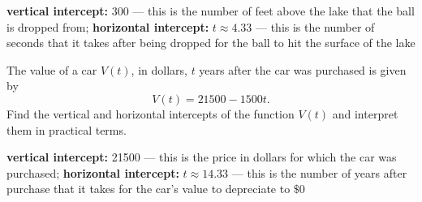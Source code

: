 \begin{solution}
    {\bf vertical intercept:} 300 --- this is the number of feet above the lake that the ball is dropped from; {\bf horizontal intercept:} $t \approx 4.33$ --- this is the number of seconds that it takes after being dropped for the ball to hit the surface of the lake
\end{solution}







\begin{exercise}
The value of a car $V(t)$, in dollars, $t$ years after the car was purchased is given by
\[V(t)=21500-1500t.\]
Find the vertical and horizontal intercepts of the function $V(t)$ and interpret them in practical terms.

\end{exercise}


\begin{solution}
    {\bf vertical intercept:} 21500 --- this is the price in dollars for which the car was purchased; {\bf horizontal intercept:} $t \approx 14.33$ --- this is the number of years after purchase that it takes for the car's value to depreciate to $\$0$
\end{solution}

